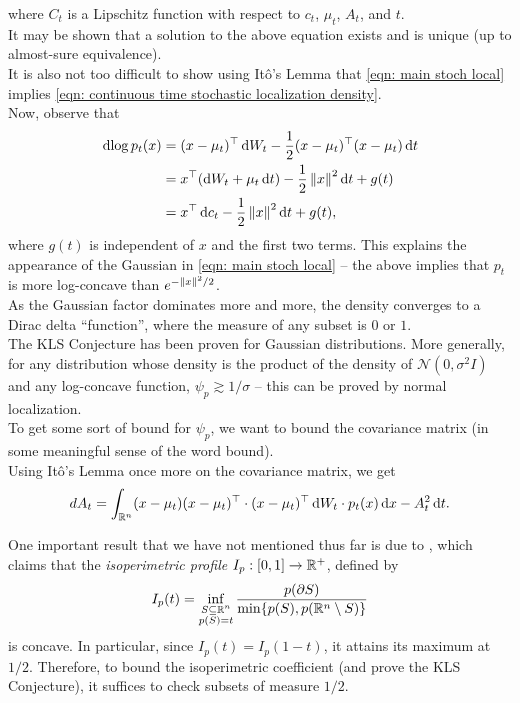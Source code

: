 		where $C_t$ is a Lipschitz function with respect to $c_t$, $\mu_t$, $A_t$, and $t$.\\
		It may be shown that a solution to the above equation exists and is unique (up to almost-sure equivalence).\\
		It is also not too difficult to show using It\^{o}'s Lemma that \eqref{eqn: main stoch local} implies \eqref{eqn: continuous time stochastic localization density}.\\


		Now, observe that
		\begin{align*}
			\d{\log p_t(x)} &= (x-\mu_t)^\top \d{W}_t - \frac{1}{2} (x-\mu_t)^\top (x-\mu_t) \d{t} \\
				&= x^\top (\d{W}_t + \mu_t\d{t}) - \frac{1}{2}\norm{x}^2\d{t} + g(t) \\
				&= x^\top\d{c}_t - \frac{1}{2}\norm{x}^2\d{t} + g(t),
		\end{align*}
		where $g(t)$ is independent of $x$ and the first two terms. This explains the appearance of the Gaussian in \eqref{eqn: main stoch local} -- the above implies that $p_t$ is more log-concave than $e^{-\left\lVert x\right\rVert^2/2}$.\\
		As the Gaussian factor dominates more and more, the density converges to a Dirac delta ``function'', where the measure of any subset is $0$ or $1$.\\

		The KLS Conjecture has been proven for Gaussian distributions. More generally, for any distribution whose density is the product of the density of $\mathcal{N}(0,\sigma^2 I)$ and any log-concave function, $\psi_p \gtrsim 1/\sigma$ -- this can be proved by normal localization.\\
		
		To get some sort of bound for $\psi_p$, we want to bound the covariance matrix (in some meaningful sense of the word bound).\\
		Using It\^{o}'s Lemma once more on the covariance matrix, we get 
		\[ d{A}_t = \int_{\mathbb{R}^n} (x-\mu_t)(x-\mu_t)^\top \cdot (x-\mu_t)^\top\operatorname{d}\!{W}_t \cdot p_t(x) \operatorname{d}\!{x} - A_t^2 \operatorname{d}\!{t}. \]
		

		One important result that we have not mentioned thus far is due to \cite{milman2008isoperimetricprofile}, which claims that the \textit{isoperimetric profile} $I_p : [0,1]\to\mathbb{R}^+$, defined by
		\[ I_p(t) = \inf_{\substack{S\subseteq\mathbb{R}^n \\ p(S) = t}} \frac{p(\partial S)}{\min\{p(S),p(\mathbb{R}^n\setminus S)\}} \]
		is concave. In particular, since $I_p(t) = I_p(1-t)$, it attains its maximum at $1/2$. Therefore, to bound the isoperimetric coefficient (and prove the KLS Conjecture), it suffices to check subsets of measure $1/2$.\\

